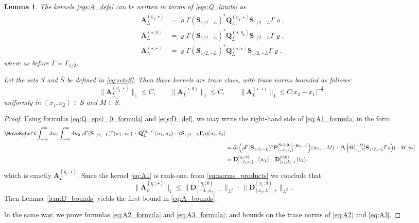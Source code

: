 \documentclass[oneside,final,11pt]{amsart}
\newtheorem{lem}[thm]{Lemma}
\theoremstyle{definition}
\newcommand\nohit{\uptext{No\! hit}}
\newcommand{\fg}{\mathfrak{g}}
\renewcommand{\d}{\mathrm{d}}
\newcommand{\1}[1]{\mathbf{1}_{#1}}
\newcommand{\uptext}[1]{\text{\upshape{#1}}}
\newcommand{\fT}{\mathbf{S}}
\newcommand{\fx}{x}
\newcommand{\fM}{M}
\newcommand{\fD}{\mathbf{D}}
\newcommand{\fP}{\mathbf{P}}
\newcommand{\fQ}{\mathbf{Q}}
\newcommand{\fA}{\mathbf{A}}
\numberwithin{equation}{section}
\begin{document}
\begin{lem}\label{lem:A_formulas}
The kernels \eqref{eqs:A_defs} can be written in terms of \eqref{eqs:Q_limits} as
\begin{subequations}\label{eqs:A_formulas}
\begin{align}
\fA_L^{(\eta_1; \star)} &= \varrho\Gamma(\fT_{1/2,-L})^* \fQ_L^{(\eta_1; \star)} \fT_{1/2,-L} \Gamma\varrho, \label{eq:A1_formula}\\
\fA_L^{(\star; 0)} &= \varrho\Gamma(\fT_{1/2,-L})^* \fQ_L^{(\star; \eta_2)} \fT_{1/2,-L} \Gamma\varrho,\label{eq:A2_formula}\\
\fA_L^{(\star; \star)} &= \varrho\Gamma (\fT_{1/2,-L})^* \fQ_L^{(\star; \star)} \fT_{1/2,-L} \Gamma \varrho,\label{eq:A3_formula}
\end{align}
\end{subequations}
where as before $\Gamma = \Gamma_{1/2}$.

Let the sets $S$ and $\bar S$ be defined in \eqref{eq:setsS}. Then these kernels are trace class, with trace norms bounded as follows:
\begin{equation}\label{eq:A_bounds}
\bigl\| \fA_L^{(\eta_1; \star)} \bigr\|_1 \leq C, \qquad \bigl\| \fA_L^{(\star; 0)} \bigr\|_1 \leq C, \qquad \bigl\|\fA_L^{(\star; \star)} \bigr\|_1 \leq C |\fx_2 - \fx_1|^{-\frac{3}{2}},
\end{equation}
uniformly in $(x_1, x_2) \in S$ and $M \in \bar S$.
\end{lem}
\begin{proof}
Using formulas \eqref{eq:Q_eps1_0_formula} and \eqref{eqs:D_def}, we may write the right-hand side of \eqref{eq:A1_formula} in the form
\begin{align}
\MoveEqLeft
\int_{-\infty}^\infty \d u_1 \int_{-\infty}^\infty \d u_2\; \varrho \Gamma (\fT_{1/2,-L})^*(w_1, u_1) \,\cdot\, \fQ_L^{(\eta_1; \star)} (u_1, u_2) \,\cdot\, (\fT_{1/2,-L} \Gamma \varrho) (u_2, \bar v_2)\\
&= \partial_{2} \Bigl( \varrho \Gamma (\fT_{1/2,-L})^* \fP_{[-L,\fx_2]}^{\nohit\,(-\fg_{\eta_1, 0})}\Bigr) (w_1, -\fM) \,\cdot\, \partial_{1} \Bigl(\Theta^{(-\fM)}_{[\fx_2, L]} \fT_{1/2,-L} \Gamma \varrho\Bigr) (-\fM, \bar v_2)\\
&= \fD^{(\eta_1; 0)}_{[-L, \fx_2], -}(w_1) \,\cdot\, \fD^{(0; 0)}_{[\fx_2, L], +}(\bar v_2),
\end{align}
which is exactly $\fA_L^{(\eta_1; \star)}$. Since the kernel \eqref{eq:A1} is rank-one, from \eqref{eq:norms_products} we conclude that
\begin{equation}
\bigl\| \fA_L^{(\eta_1; \star)} \bigr\|_1 \leq \bigl\| \fD^{(\eta_1; 0)}_{[-L, \fx_2], -} \bigr\|_{L^2} \, \cdot\, \bigl\| \fD^{(\eta_1; 0)}_{[\fx_2, L], +} \bigr\|_{L^2}.
\end{equation}
Then Lemma~\ref{lem:D_bounds} yields the first bound in \eqref{eq:A_bounds}.

In the same way, we prove formulas \eqref{eq:A2_formula} and \eqref{eq:A3_formula}; and bounds on the trace norms of \eqref{eq:A2} and \eqref{eq:A3}.
\end{proof}
\end{document}
